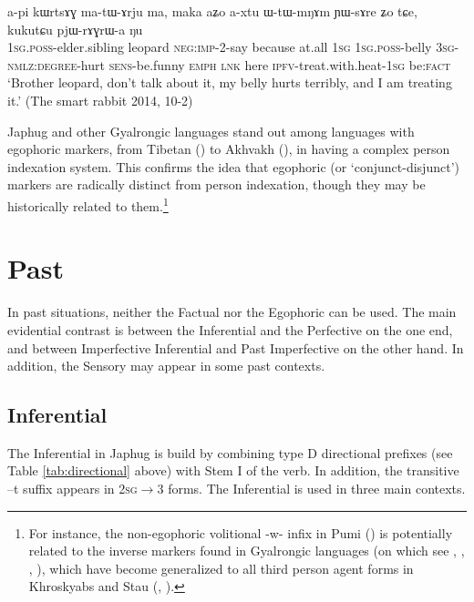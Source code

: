 \documentclass[oldfontcommands,oneside,a4paper,11pt]{article}
\newcommand{\ipa}[1]{{\phon \mbox{#1}}} %
\newcommand{\factual}[1]{\textsc{:fact}}
\begin{document}
 \begin{exe}
\ex \label{ex:pjWrAGrWa}
\gll
 \ipa{a-pi} 	\ipa{kɯrtsɤɣ} 	\ipa{ma-tɯ-ɤrju} 	\ipa{ma,} 	\ipa{maka} 	\ipa{aʑo} 	\ipa{a-xtu} 	\ipa{ɯ-tɯ-mŋɤm} 	\ipa{ɲɯ-sɤre} 	\ipa{ʑo} 	\ipa{tɕe,} 	\ipa{kukutɕu} 	\ipa{pjɯ-rɤɣrɯ-a} 	\ipa{ŋu} 	\\
 \textsc{1sg.poss}-elder.sibling leopard \textsc{neg:imp}-2-say because at.all \textsc{1sg} \textsc{1sg.poss}-belly \textsc{3sg-nmlz:degree}-hurt \textsc{sens}-be.funny \textsc{emph} \textsc{lnk} here \textsc{ipfv}-treat.with.heat-\textsc{1sg} be\factual{}  \\
\glt `Brother leopard, don't talk about it, my belly hurts terribly, and I am treating it.' (The smart rabbit 2014, 10-2)
 \end{exe}
 
Japhug and other Gyalrongic languages stand out among languages with egophoric markers, from Tibetan (\citealt{tournadre08conjunct}) to Akhvakh (\citealt{creissels08akhvakh}), in having  a complex person indexation system. This confirms the idea that egophoric (or `conjunct-disjunct') markers are radically distinct from person indexation, though they may be historically related to them.\footnote{For instance, the non-egophoric volitional \ipa{-w-} infix in Pumi (\citealt{daudey14volition}) is potentially related to the inverse markers found in Gyalrongic languages (on which see \citealt{delancey81direction}, \citealt{jackson02rentongdengdi}, \citealt{jacques10inverse}, \citealt{gongxun14agreement}), which have become generalized to all third person agent forms in Khroskyabs and Stau (\citealt{jacques14rtau}, \citealt{lai14person}).}

 
\section{Past} \label{sec:evd:pst}
In past situations, neither the Factual nor the Egophoric  can be used. The main evidential contrast is between the Inferential and the Perfective on the one end, and between Imperfective Inferential and Past Imperfective on the other hand. In addition, the Sensory may appear in some past contexts.


\subsection{Inferential}  \label{sec:ifr}
The Inferential in Japhug is build by combining type D directional prefixes (see Table \ref{tab:directional} above) with Stem I of the verb. In addition, the transitive \ipa{--t} suffix appears in \textsc{2sg}$\rightarrow$3 forms. The Inferential is used in three main contexts. 
\end{document}
